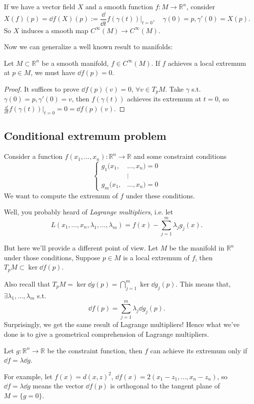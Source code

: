 If we have a vector field $X$ and a smooth function $f: M\to \mathbb{R}^n$,
consider
\[
X(f)(p) = \dd f(X)(p) := \frac{\dd}{\dd t}f(\gamma(t))\Big|_{t=0},\quad
\gamma(0) = p, \gamma'(0) = X(p).
\]
So $X$ induces a smooth map $C^\infty(M) \to C^\infty(M)$.

Now we can generalize a well known result to manifolds:
\begin{proposition}
	Let $M \subset \mathbb{R}^{n}$ be a smooth manifold, $f\in C^\infty(M)$.
	If $f$ achieves a local extremum at $p\in M$,
	we must have $\dd f(p) = 0$.
\end{proposition}
\begin{proof}[Proof]
    It suffices to prove $\dd f(p)(v) = 0$, $\forall v\in T_pM$.
	Take  $\gamma$ s.t. $\gamma(0) = p, \gamma'(0) = v$,
	then $f(\gamma(t))$ achieves its extremum at $t = 0$,
	so $\frac{\dd}{\dd t} f(\gamma(t))\big|_{t = 0} = 0 = \dd f(p) (v)$.
\end{proof}

\subsection{Conditional extremum problem}
\label{sub:Conditional extremum problem}
Consider a function $f(x_1, \dots, x_n): \mathbb{R}^{n}\to \mathbb{R}$ and
some constraint conditions
\[
\left\{\begin{aligned}
		g_1(x_1,&\dots, x_n) = 0\\ &\vdots\\ g_m(x_1,&\dots, x_n) = 0
\end{aligned}
\right.
\]
We want to compute the extremum of $f$ under these conditions.

Well, you probably heard of \textit{Lagrange multipliers},
i.e. let
\[
L(x_1,\dots,x_n,\lambda_1,\dots,\lambda_m) = f(x) -
\sum_{j=1}^{m} \lambda_jg_j(x).
\]

But here we'll provide a different point of view.
Let $M$ be the manifold in $\mathbb{R}^n$ under those conditions,
Suppose $p\in M$ is a local extremum of $f$, then $T_pM \subset \ker\dd f(p)$.

Also recall that $T_p M = \ker \dd g(p) = \bigcap_{j=1}^m \ker \dd g_j(p)$.
This means that, $\exists \lambda_1,\dots,\lambda_m$ s.t.
\[
\dd f(p) = \sum_{j=1}^{m} \lambda_j \dd g_j(p).
\]
Surprisingly, we get the same result of Lagrange multipliers!
Hence what we've done is to give a geometrical comprehension of
Lagrange multipliers.

\begin{example}
    Let $g: \mathbb{R}^n\to \mathbb{R}$ be the constraint function,
	then $f$ can achieve its extremum only if $\dd f = \lambda \dd g$.

	For example, let $f(x) = d(x, z)^2$, $\dd f(x) = 2(x_1-z_1,\dots, x_n-z_n)$,
	so $\dd f = \lambda \dd g$ means the vector $\dd f(p)$ is orthogonal
	to the tangent plane of $M = \{g = 0\}$.
\end{example}

